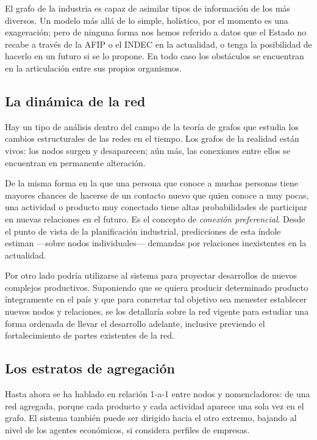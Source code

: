 \documentclass[a4paper]{report}
\begin{document}
El grafo de la industria es capaz de asimilar tipos de información de los más diversos. Un modelo más allá de lo simple, holístico, por el momento es una exageración; pero de ninguna forma nos hemos referido a datos que el Estado no recabe a través de la AFIP o el INDEC en la actualidad, o tenga la posibilidad de hacerlo en un futuro si se lo propone. En todo caso los obstáculos se encuentran en la articulación entre sus propios organismos.

\subsection*{La dinámica de la red}

Hay un tipo de análisis dentro del campo de la teoría de grafos que estudia los cambios estructurales de las redes en el tiempo. Los grafos de la realidad están vivos: los nodos surgen y desaparecen; aún más, las conexiones entre ellos se encuentran en permanente alteración.

De la misma forma en la que una persona que conoce a muchas personas tiene mayores chances de hacerse de un contacto nuevo que quien conoce a muy pocas, una actividad o producto muy conectado tiene altas probabilidades de participar en nuevas relaciones en el futuro. Es el concepto de \textit{conexión preferencial}. Desde el punto de vista de la planificación industrial, predicciones de esta índole estiman —sobre nodos individuales— demandas por relaciones inexistentes en la actualidad.

Por otro lado podría utilizarse al sistema para proyectar desarrollos de nuevos complejos productivos. Suponiendo que se quiera producir determinado producto íntegramente en el país y que para concretar tal objetivo sea menester establecer nuevos nodos y relaciones, se los detallaría sobre la red vigente para estudiar una forma ordenada de llevar el desarrollo adelante, inclusive previendo el fortalecimiento de partes existentes de la red.

\subsection*{Los estratos de agregación}

Hasta ahora se ha hablado en relación 1-a-1 entre nodos y nomencladores: de una red agregada, porque cada producto y cada actividad aparece una sola vez en el grafo. El sistema también puede ser dirigido hacia el otro extremo, bajando al nivel de los agentes económicos, si considera perfiles de empresas.
\end{document}
